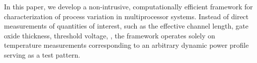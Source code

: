In this paper, we develop a non-intrusive, computationally efficient framework for characterization of process variation in multiprocessor systems. Instead of direct measurements of quantities of interest, such as the effective channel length, gate oxide thickness, threshold voltage, \etc, the framework operates solely on temperature measurements corresponding to an arbitrary dynamic power profile serving as a test pattern.
